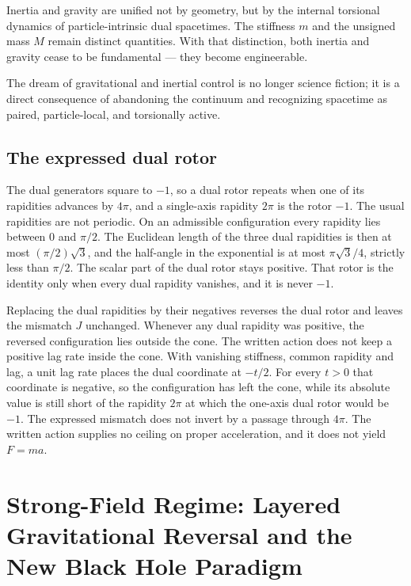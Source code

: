 \documentclass[a4paper]{article}
\begin{document}
Inertia and gravity are unified not by geometry, but by the internal torsional dynamics of particle-intrinsic dual spacetimes. The stiffness $m$ and the unsigned mass $M$ remain distinct quantities. With that distinction, both inertia and gravity cease to be fundamental — they become engineerable.

The dream of gravitational and inertial control is no longer science fiction; it is a direct consequence of abandoning the continuum and recognizing spacetime as paired, particle-local, and torsionally active.

\subsection{The expressed dual rotor}
\label{subsec:acceleration-limit}

The dual generators square to $-1$, so a dual rotor repeats when one of its rapidities advances by $4\pi$, and a single-axis rapidity $2\pi$ is the rotor $-1$. The usual rapidities are not periodic. On an admissible configuration every rapidity lies between $0$ and $\pi/2$. The Euclidean length of the three dual rapidities is then at most $(\pi/2)\sqrt{3}$, and the half-angle in the exponential is at most $\pi\sqrt{3}/4$, strictly less than $\pi/2$. The scalar part of the dual rotor stays positive. That rotor is the identity only when every dual rapidity vanishes, and it is never $-1$.

Replacing the dual rapidities by their negatives reverses the dual rotor and leaves the mismatch $J$ unchanged. Whenever any dual rapidity was positive, the reversed configuration lies outside the cone. The written action does not keep a positive lag rate inside the cone. With vanishing stiffness, common rapidity and lag, a unit lag rate places the dual coordinate at $-t/2$. For every $t>0$ that coordinate is negative, so the configuration has left the cone, while its absolute value is still short of the rapidity $2\pi$ at which the one-axis dual rotor would be $-1$. The expressed mismatch does not invert by a passage through $4\pi$. The written action supplies no ceiling on proper acceleration, and it does not yield $F=ma$.

\section{Strong-Field Regime: Layered Gravitational Reversal and the New Black Hole Paradigm}
\label{sec:strongfield}
\end{document}
